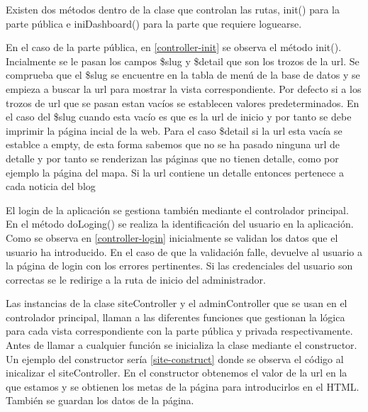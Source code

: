 \vspace{5 mm}

Existen dos métodos dentro de la clase que controlan las rutas, init() para la parte pública e iniDashboard() para la parte que requiere loguearse.

\vspace{5 mm}

En el caso de la parte pública, en \ref{controller-init} se observa el método init(). Incialmente se le pasan los campos \$slug y \$detail que son los trozos de la url.
Se comprueba que el \$slug se encuentre en la tabla de menú de la base de datos y se empieza a buscar la url para mostrar la vista correspondiente. Por defecto si a los trozos de url que se pasan estan vacíos se establecen valores predeterminados. En el caso del \$slug cuando esta vacío es que es la url de inicio y por tanto se debe imprimir la página incial de la web. Para el caso \$detail si la url esta vacía se establce a empty, de esta forma sabemos que no se ha pasado ninguna url de detalle y por tanto se renderizan las páginas que no tienen detalle, como por ejemplo la página del mapa. Si la url contiene un detalle entonces pertenece a cada noticia del blog

\vspace{5 mm}

El login de la aplicación se gestiona también mediante el controlador principal. En el método doLoging() se realiza la identificación del usuario en la
aplicación. Como se observa en \ref{controller-login} inicialmente se validan los datos que el usuario ha introducido. En el caso de que la validación falle,
devuelve al usuario a la página de login con los errores pertinentes. Si las credenciales del usuario son correctas se le redirige a la ruta de inicio del
administrador.

\vspace{5 mm}

Las instancias de la clase siteController y el adminController que se usan en el controlador principal, llaman a las diferentes funciones que gestionan la lógica
para cada vista correspondiente con la parte pública y privada respectivamente. Antes de llamar a cualquier función se inicializa la clase mediante el constructor.
Un ejemplo del constructor sería \ref{site-construct} donde se observa el código al inicalizar el siteController. En el constructor obtenemos
el valor de la url en la que estamos y se obtienen los metas de la página  para introducirlos en el HTML. También se guardan los datos de la página.

